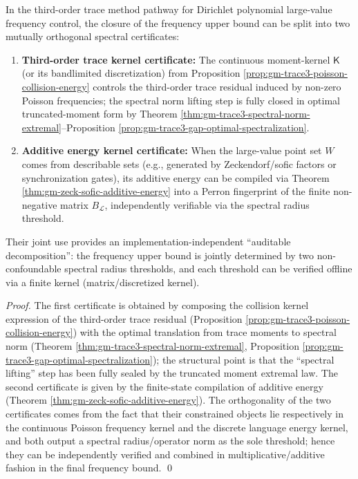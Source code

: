 \begin{theorem}\label{thm:gm-dual-spectral-certificates}
In the third-order trace method pathway for Dirichlet polynomial large-value frequency control, the closure of the frequency upper bound can be split into two mutually orthogonal spectral certificates:
\begin{enumerate}
  \item \textbf{Third-order trace kernel certificate:} The continuous moment-kernel \(\mathsf{K}\) (or its bandlimited discretization) from Proposition \ref{prop:gm-trace3-poisson-collision-energy} controls the third-order trace residual induced by non-zero Poisson frequencies; the spectral norm lifting step is fully closed in optimal truncated-moment form by Theorem \ref{thm:gm-trace3-spectral-norm-extremal}--Proposition \ref{prop:gm-trace3-gap-optimal-spectralization}.
  \item \textbf{Additive energy kernel certificate:} When the large-value point set \(W\) comes from describable sets (e.g., generated by Zeckendorf/sofic factors or synchronization gates), its additive energy can be compiled via Theorem \ref{thm:gm-zeck-sofic-additive-energy} into a Perron fingerprint of the finite non-negative matrix \(B_{\mathcal{L}}\), independently verifiable via the spectral radius threshold.
\end{enumerate}
Their joint use provides an implementation-independent ``auditable decomposition'': the frequency upper bound is jointly determined by two non-confoundable spectral radius thresholds, and each threshold can be verified offline via a finite kernel (matrix/discretized kernel).
\end{theorem}

\begin{proof}
The first certificate is obtained by composing the collision kernel expression of the third-order trace residual (Proposition \ref{prop:gm-trace3-poisson-collision-energy}) with the optimal translation from trace moments to spectral norm (Theorem \ref{thm:gm-trace3-spectral-norm-extremal}, Proposition \ref{prop:gm-trace3-gap-optimal-spectralization}); the structural point is that the ``spectral lifting'' step has been fully sealed by the truncated moment extremal law.
The second certificate is given by the finite-state compilation of additive energy (Theorem \ref{thm:gm-zeck-sofic-additive-energy}).
The orthogonality of the two certificates comes from the fact that their constrained objects lie respectively in the continuous Poisson frequency kernel and the discrete language energy kernel, and both output a spectral radius/operator norm as the sole threshold; hence they can be independently verified and combined in multiplicative/additive fashion in the final frequency bound. \qed
\end{proof}

\endinput
